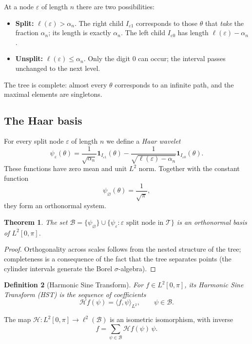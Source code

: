 \documentclass[11pt,a4paper]{article}
\newtheorem{theorem}{Theorem}[section]
\newtheorem{definition}[theorem]{Definition}
\theoremstyle{remark}
\begin{document}
At a node \(\varepsilon\) of length \(n\) there are two possibilities:
\begin{itemize}
    \item \textbf{Split:} \(\ell(\varepsilon)>\alpha_n\). The right child \(I_{\varepsilon1}\) corresponds to those \(\theta\) that \emph{take} the fraction \(\alpha_n\); its length is exactly \(\alpha_n\). The left child \(I_{\varepsilon0}\) has length \(\ell(\varepsilon)-\alpha_n\).
    \item \textbf{Unsplit:} \(\ell(\varepsilon)\le\alpha_n\). Only the digit \(0\) can occur; the interval passes unchanged to the next level.
\end{itemize}
The tree is complete: almost every \(\theta\) corresponds to an infinite path, and the maximal elements are singletons.

\subsection{The Haar basis}
For every split node \(\varepsilon\) of length \(n\) we define a \emph{Haar wavelet}
\begin{equation}\label{eq:wavelet}
\psi_\varepsilon(\theta)=
\frac{1}{\sqrt{\alpha_n}}\mathbf{1}_{I_{\varepsilon1}}(\theta)
-\frac{1}{\sqrt{\ell(\varepsilon)-\alpha_n}}\mathbf{1}_{I_{\varepsilon0}}(\theta).
\end{equation}
These functions have zero mean and unit \(L^2\) norm. Together with the constant function
\[
\psi_\varnothing(\theta)=\frac{1}{\sqrt{\pi}},
\]
they form an orthonormal system.

\begin{theorem}\label{thm:haarbasis}
The set \(\mathcal{B}=\{\psi_\varnothing\}\cup\{\psi_\varepsilon:\varepsilon\text{ split node in }\mathcal{T}\}\) is an orthonormal basis of \(L^2[0,\pi]\).
\end{theorem}
\begin{proof}
Orthogonality across scales follows from the nested structure of the tree; completeness is a consequence of the fact that the tree separates points (the cylinder intervals generate the Borel \(\sigma\)-algebra).
\end{proof}

\begin{definition}[Harmonic Sine Transform]
For \(f\in L^2[0,\pi]\), its \emph{Harmonic Sine Transform} (HST) is the sequence of coefficients
\[
\mathcal{H}f(\psi)=\langle f,\psi\rangle_{L^2},\qquad \psi\in\mathcal{B}.
\]
\end{definition}
The map \(\mathcal{H}:L^2[0,\pi]\to\ell^2(\mathcal{B})\) is an isometric isomorphism, with inverse
\[
f=\sum_{\psi\in\mathcal{B}}\mathcal{H}f(\psi)\,\psi .
\]
\end{document}
